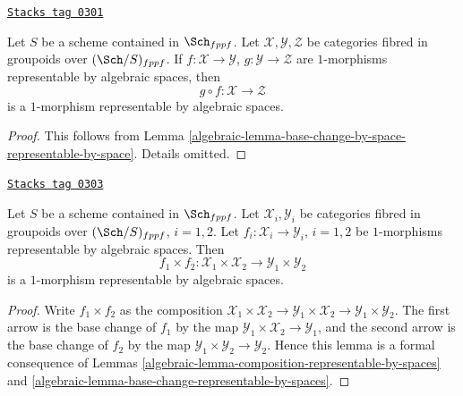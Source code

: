 \begin{lemma}
\label{algebraic-lemma-composition-representable-by-spaces}
\href{https://stacks.math.columbia.edu/tag/0301}{\texttt{Stacks tag 0301}}

Let $S$ be a scheme contained in $\Sch_{fppf}$.
Let $\mathcal{X}, \mathcal{Y}, \mathcal{Z}$
be categories fibred in groupoids over $(\Sch/S)_{fppf}$.
If $f : \mathcal{X} \to \mathcal{Y}$, $g : \mathcal{Y} \to \mathcal{Z}$
are $1$-morphisms representable by algebraic spaces, then
$$
g \circ f : \mathcal{X} \longrightarrow \mathcal{Z}
$$
is a $1$-morphism representable by algebraic spaces.
\end{lemma}

\begin{proof}

This follows from
Lemma \ref{algebraic-lemma-base-change-by-space-representable-by-space}.
Details omitted.
\end{proof}

\begin{lemma}
\label{algebraic-lemma-product-representable-by-spaces}
\href{https://stacks.math.columbia.edu/tag/0303}{\texttt{Stacks tag 0303}}

Let $S$ be a scheme contained in $\Sch_{fppf}$.
Let $\mathcal{X}_i, \mathcal{Y}_i$ be categories fibred in groupoids over
$(\Sch/S)_{fppf}$, $i = 1, 2$.
Let $f_i : \mathcal{X}_i \to \mathcal{Y}_i$, $i = 1, 2$
be $1$-morphisms representable by algebraic spaces.
Then
$$
f_1 \times f_2 :
\mathcal{X}_1 \times \mathcal{X}_2
\longrightarrow
\mathcal{Y}_1 \times \mathcal{Y}_2
$$
is a $1$-morphism representable by algebraic spaces.
\end{lemma}

\begin{proof}

Write $f_1 \times f_2$ as the composition
$\mathcal{X}_1 \times \mathcal{X}_2 \to
\mathcal{Y}_1 \times \mathcal{X}_2 \to
\mathcal{Y}_1 \times \mathcal{Y}_2$.
The first arrow is the base change of $f_1$ by the map
$\mathcal{Y}_1 \times \mathcal{X}_2 \to \mathcal{Y}_1$, and the second arrow
is the base change of $f_2$ by the map
$\mathcal{Y}_1 \times \mathcal{Y}_2 \to \mathcal{Y}_2$.
Hence this lemma is a formal
consequence of Lemmas \ref{algebraic-lemma-composition-representable-by-spaces}
and \ref{algebraic-lemma-base-change-representable-by-spaces}.
\end{proof}


